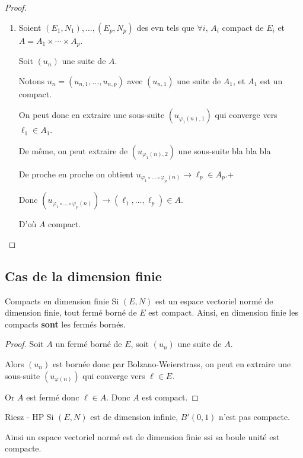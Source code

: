 \begin{proof}
\begin{enumerate}
        Or $\forall n \in \N, \, N(u_{\varphi(n)} - a) > \varepsilon$, 
        donc à la limite $0 \geqslant \varepsilon$, absurde.

        \item Soient $(E_1, N_1), \ldots, (E_p, N_p)$ des evn tels que 
        $\forall i, \, A_i$ compact de $E_i$ et $A = A_1 \times \cdots \times A_p$. 

        Soit $(u_n)$ une suite de $A$.

        Notons $u_n = (u_{n, 1}, \ldots, u_{n, p})$ avec $(u_{n, 1})$ une suite de $A_1$, et $A_1$ est un compact. 

        On peut donc en extraire une sous-suite $(u_{\varphi_1(n), 1})$ qui converge vers $\ell_1 \in A_1$.

        De même, on peut extraire de $(u_{\varphi_1(n), 2})$ une sous-suite bla bla bla 

        De proche en proche on obtient $u_{\varphi_1 \circ \ldots \circ \varphi_p(n)} \to \ell_p \in A_p$.+

        Donc $(u_{\varphi_1 \circ \ldots \circ \varphi_p(n)}) \to (\ell_1, \ldots, \ell_p) \in A$.

        D'où $A$ compact. 
    \end{enumerate}
\end{proof}

\subsection{Cas de la dimension finie}

\begin{theoreme}{Compacts en dimension finie}{}
    Si $(E, N)$ est un espace vectoriel normé de dimension finie, tout fermé borné de $E$ est compact. Ainsi, en 
    dimension finie les compacts \textbf{sont} les fermés bornés. 
\end{theoreme}


\begin{proof}
    Soit $A$ un fermé borné de $E$, soit $(u_n)$ une suite de $A$.

    Alors $(u_n)$ est bornée donc par Bolzano-Weierstrass, on peut en extraire une
    sous-suite $(u_{\varphi(n)})$ qui converge vers $\ell \in E$.

    Or $A$ est fermé donc $\ell \in A$. Donc $A$ est compact.
\end{proof}

\begin{theoreme}{Riesz - HP}{}
    Si $(E, N)$ est de dimension infinie, $B'(0, 1)$ n'est pas compacte. 

    Ainsi un espace vectoriel normé est de dimension finie ssi sa boule unité est compacte. 
\end{theoreme}

